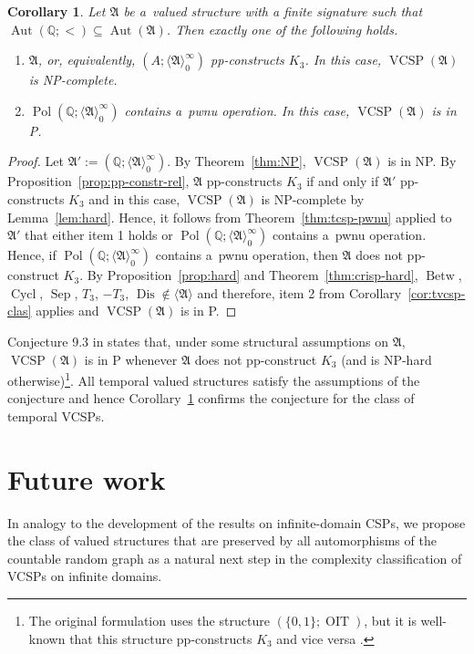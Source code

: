 \documentclass[preprint,12pt]{elsarticle}
\newcommand{\Q}{\mathbb Q}
\newcommand{\bA}{{\mathfrak A}}
\newcommand{\checked}[1]{#1}
\DeclareMathOperator{\Cyc}{Cycl}
\DeclareMathOperator{\Aut}{Aut}
\DeclareMathOperator{\VCSP}{VCSP}
\DeclareMathOperator{\Pol}{Pol}
\DeclareMathOperator{\OIT}{OIT}
\DeclareMathOperator{\Betw}{Betw}
\DeclareMathOperator{\Sep}{Sep}
\DeclareMathOperator{\Dis}{Dis}
\newtheorem{corollary}[theorem]{Corollary}
\begin{document}
\begin{corollary}\label{cor:clas-refor}
Let $\bA$ be a~valued structure with a finite signature such that $\Aut(\Q; <) \subseteq \Aut(\bA)$. Then exactly one of the following holds.
\begin{enumerate}
\item $\bA$, \checked{or, equivalently, $(A; \langle \bA \rangle_0^\infty)$} pp-constructs $K_3$. In this case, $\VCSP(\bA)$ is NP-complete.
\item $\Pol(\Q; \langle \bA \rangle_0^\infty)$ contains a~pwnu operation. In this case, $\VCSP(\bA)$ is in P.
\end{enumerate}
\end{corollary}

\begin{proof}
Let $\bA':=(\Q;\langle \bA \rangle_0^\infty)$. By Theorem~\ref{thm:NP}, $\VCSP(\bA)$ is in NP.
By Proposition~\ref{prop:pp-constr-rel}, $\bA$ pp-constructs $K_3$ if and only if $\bA'$ pp-constructs $K_3$ and in this case, $\VCSP(\bA)$ is NP-complete by Lemma~\ref{lem:hard}. Hence, it follows from Theorem~\ref{thm:tcsp-pwnu} applied to  $\bA'$ that either item 1 holds or $\Pol(\Q; \langle \bA \rangle_0^\infty)$ contains a~pwnu operation. Hence, if $\Pol(\Q; \langle \bA \rangle_0^\infty)$ contains a~pwnu operation, then $\bA$ does not pp-construct $K_3$. By Proposition~\ref{prop:hard} and Theorem~\ref{thm:crisp-hard},
$\Betw$, $\Cyc$, $\Sep$, $T_3$, $-T_3$, $\Dis \notin \langle \bA \rangle$ and therefore, item 2 from Corollary~\ref{cor:tvcsp-clas} applies and $\VCSP(\bA)$ is in P.
\end{proof}


Conjecture 9.3 in \cite{Resilience-VCSPs} states that, under some structural assumptions on $\bA$, $\VCSP(\bA)$ is in P whenever $\bA$ does not pp-construct $K_3$
(and is NP-hard otherwise)\footnote{The original formulation uses the structure $(\{0,1\};\OIT)$, but it is well-known that this structure pp-constructs $K_3$ and vice versa \cite{Book}.}. All temporal \checked{valued} structures
satisfy the assumptions of the conjecture and hence Corollary~\ref{cor:clas-refor} confirms the conjecture for the class of temporal VCSPs. 


\section{Future work}
\label{sect:gvcsps}
In analogy to the development of the results on infinite-domain CSPs, we propose the class of valued structures that are preserved by all automorphisms of the countable random graph as a natural next step in the complexity classification of VCSPs on infinite domains.
\end{document}
